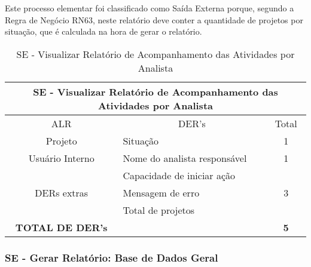       Este processo elementar foi classificado como Saída Externa porque, segundo a Regra de Negócio RN63, neste relatório
    deve conter a quantidade de projetos por situação, que é calculada na hora de gerar o relatório.
      
      \begin{table}[!h]
      \centering
      \caption{SE - Visualizar Relatório de Acompanhamento das Atividades por Analista}
      \label{se_visualizar_relatorio_acompanhamento_analista}
      \begin{tabular}{|c|l|c|}
      \hline
      \multicolumn{3}{|c|}{SE - Visualizar Relatório de Acompanhamento das Atividades por Analista} \\ \hline
      ALR                               & \multicolumn{1}{c|}{DER's}       & Total                  \\ \hline
      Projeto                           & Situação                         & 1                      \\ \hline
      Usuário Interno                          & Nome do analista responsável     & 1                      \\ \hline
      \multirow{3}{*}{DERs extras}      & Capacidade de iniciar ação       & \multirow{3}{*}{3}     \\ \cline{2-2}
					& Mensagem de erro                 &                        \\ \cline{2-2}
					& Total de projetos                &                        \\ \hline
      \textbf{TOTAL DE DER's}           &                                  & \textbf{5}             \\ \hline
      \end{tabular}
      \end{table}
  

    
  \subsubsection{SE - Gerar Relatório: Base de Dados Geral}
   
